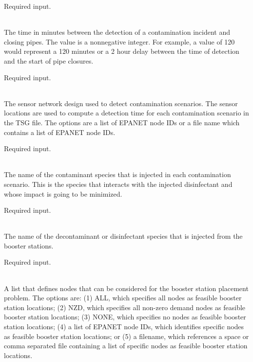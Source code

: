 \begin{description}[topsep=0pt,parsep=0.5em,itemsep=-0.4em]
\begin{description}[topsep=0pt,parsep=0.5em,itemsep=-0.4em]
\begin{description}[topsep=0pt,parsep=0.5em,itemsep=-0.4em]
                Required input.
      \item[{response time}]\hfill
\\The time in minutes between the detection of a contamination incident and 
                closing pipes. The value is a nonnegative integer. For example, 
                a value of 120 would represent a 120 minutes or a 2 hour delay between 
                the time of detection and the start of pipe closures.
                
                Required input.
    \end{description}
  \end{description}
  \item[{booster msx}]\hfill
  \begin{description}[topsep=0pt,parsep=0.5em,itemsep=-0.4em]
    \item[{detection}]\hfill
\\The sensor network design used to detect contamination scenarios. The
                sensor locations are used to compute a detection time for each 
                contamination scenario in the TSG file. The options are a list of 
                EPANET node IDs or a file name which contains a list of EPANET node IDs.
                
                Required input.
    \item[{toxin species}]\hfill
\\The name of the contaminant species that is injected in each
                contamination scenario. This is the species that interacts with the 
                injected disinfectant and whose impact is going to be minimized.
                
                Required input.
    \item[{decon species}]\hfill
\\The name of the decontaminant or disinfectant species that is injected from the 
                booster stations.
                
                Required input.
    \item[{feasible nodes}]\hfill
\\A list that defines nodes that can be considered for the booster station placement problem.
                The options are: (1) ALL, which specifies all nodes as feasible booster station locations;
                (2) NZD, which specifies all non-zero demand nodes as feasible booster station locations;
                (3) NONE, which specifies no nodes as feasible booster station locations;
                (4) a list of EPANET node IDs, which identifies specific nodes as feasible booster station locations; or
                (5) a filename, which references a space or comma separated file containing a list of 
                specific nodes as feasible booster station locations.
                

\end{description}
\end{description}
